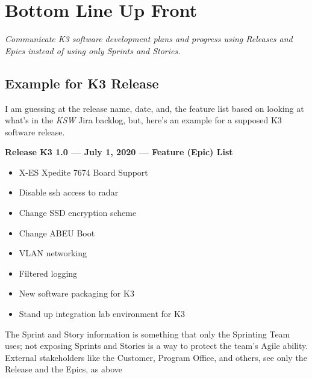 \documentclass[letterpaper,11pt]{texMemo} %
\begin{document}
\maketitle %


\section*{Bottom Line Up Front}

\emph{Communicate K3 software development plans and progress using \emph{Releases} and \emph{Epics} instead of using only \emph{Sprints and Stories}.}

\subsection*{Example for K3 Release}

I am guessing at the release name, date, and, the feature list based on looking at what's in the \emph{KSW} Jira backlog, but, here's an example for a supposed K3 software release.

\textbf{Release K3 1.0 --- July 1, 2020 --- Feature (Epic) List}
\begin{itemize}
[noitemsep]
\item X-ES Xpedite 7674 Board Support
\item Disable ssh access to radar
\item Change SSD encryption scheme
\item Change ABEU Boot
\item VLAN networking
\item Filtered logging
\item New software packaging for K3
\item Stand up integration lab environment for K3
\end{itemize}

The Sprint and Story information is something that only the Sprinting Team uses; not exposing Sprints and Stories is a way to protect the team's Agile ability. External stakeholders like the Customer, Program Office, and others, see only the Release and the Epics, as above

\end{document}
